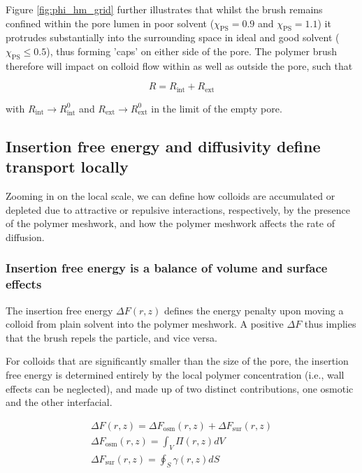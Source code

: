 \documentclass[12pt, a4paper]{article}
\begin{document}
Figure \ref{fig:phi_hm_grid} further illustrates that whilst the brush remains confined within the pore lumen in poor solvent ($\chi_{\text{PS}}=0.9$ and $\chi_{\text{PS}}=1.1$) 
it protrudes substantially into the surrounding space in ideal and good solvent ($\chi_{\text{PS}}\le0.5$), thus forming 'caps' on either side of the pore.  
The polymer brush therefore will impact on colloid flow within as well as outside the pore, such that

\begin{equation}
    R=R_{\text{int}}+R_{\text{ext}}
    \label{eq:R_tot_tot}
\end{equation}
    
\noindent with $R_{\text{int}}\rightarrow R_{\text{int}}^{0}$ and $R_{\text{ext}}\rightarrow R_{\text{ext}}^{0}$ in the limit of the empty pore. 


\subsection{Insertion free energy and diffusivity define transport locally}

Zooming in on the local scale, we can define how colloids are accumulated or depleted due to attractive or repulsive interactions, respectively, by the presence of the polymer meshwork, 
and how the polymer meshwork affects the rate of diffusion.

\subsubsection{Insertion free energy is a balance of volume and surface effects}

The insertion free energy $\Delta F(r,z)$ defines the energy penalty upon moving a colloid from plain solvent into the polymer meshwork.
A positive $\Delta F$ thus implies that the brush repels the particle, and vice versa.

For colloids that are significantly smaller than the size of the pore, the insertion free energy is determined entirely by the local polymer concentration (i.e., wall effects can be neglected), 
and made up of two distinct contributions, one osmotic and the other interfacial.

\begin{eqnarray}
    \Delta F (r,z)= \Delta F_{\text{osm}}(r,z) + \Delta F_{\text{sur}}(r,z)
    \\
    \Delta F_{\text{osm}}(r,z) = \int_{V} \Pi(r,z) dV
    \\
    \Delta F_{\text{sur}}(r,z) = \oint_{S} \gamma (r,z) dS
    \label{eq:Delta_F}
\end{eqnarray}
\end{document}
